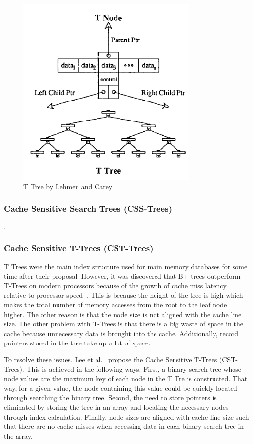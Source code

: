 \documentclass[12pt,a4paper]{article}
\begin{document}
\begin{figure}[!t]
\centering
\includegraphics[width=9cm]{figs/Ttree.png}
\caption{T Tree by Lehmen and Carey~\cite{lehman1986study}}
\label{fig:ttree}
\end{figure}

\subsubsection*{Cache Sensitive Search Trees (CSS-Trees)}
\cite{rao1999cache}.


\subsubsection*{Cache Sensitive T-Trees (CST-Trees)}

T Trees were the main index structure used for main memory databases for some time after their proposal. However, it was discovered that B+-trees outperform
T-Trees on modern processors because of the growth of cache miss latency relative to processor speed~\cite{rao1999cache,lee2007cst}. This is because the height
of the tree is high which makes the total number of memory accesses from the root to the leaf node higher. The other reason is that the node size is not aligned
with the cache line size. The other problem with T-Trees is that there is a big waste of space in the cache because unnecessary data is brought into the cache.
Additionally, record pointers stored in the tree take up a lot of space.


To resolve these issues, Lee et al.~\cite{lee2007cst} propose the Cache Sensitive T-Trees (CST-Trees). This is achieved in the following ways. First, a binary
search tree whose node values are the maximum key of each node in the T Tre is constructed. That way, for a given value, the node containing this value could be
quickly located through searching the binary tree. Second, the need to store pointers is eliminated by storing the tree in an array and locating the necessary
nodes through index calculation. Finally, node sizes are aligned with cache line size such that there are no cache misses when accessing data in each binary
search tree in the array.
\end{document}
